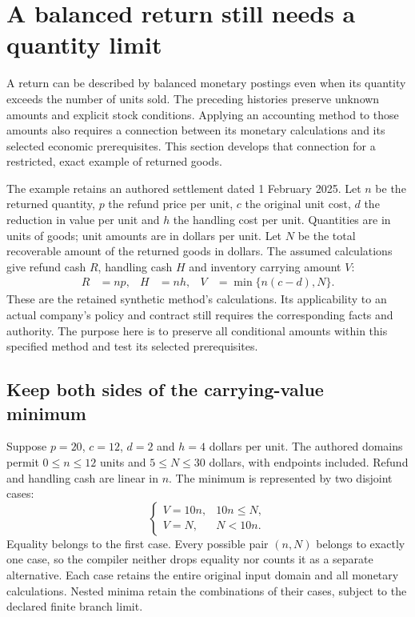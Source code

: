 \section{A balanced return still needs a quantity limit}
\label{sec:conditional-method-families}

A return can be described by balanced monetary postings even when its quantity
exceeds the number of units sold. The preceding histories preserve unknown
amounts and explicit stock conditions. Applying an accounting method to those
amounts also requires a connection between its monetary calculations and its
selected economic prerequisites. This section develops that connection for a
restricted, exact example of returned goods.

The example retains an authored settlement dated 1 February 2025. Let \(n\)
be the returned quantity, \(p\) the refund price per unit, \(c\) the original
unit cost, \(d\) the reduction in value per unit and \(h\) the handling cost
per unit. Quantities are in units of goods; unit amounts are in dollars per
unit. Let \(N\) be the total recoverable amount of the returned goods in
dollars. The assumed calculations give refund cash \(R\), handling cash \(H\)
and inventory carrying amount \(V\):
\begin{align}
\label{eq:method-family-amounts}
 R&=np, & H&=nh, & V&=\min\{n(c-d),N\}.
\end{align}
These are the retained synthetic method's calculations. Its applicability to
an actual company's policy and contract still requires the corresponding facts
and authority. The purpose here is to preserve all conditional amounts within
this specified method and test its selected prerequisites.

\subsection{Keep both sides of the carrying-value minimum}

Suppose \(p=20\), \(c=12\), \(d=2\) and \(h=4\) dollars per unit. The
authored domains permit \(0\leq n\leq12\) units and \(5\leq N\leq30\)
dollars, with endpoints included. Refund and handling cash are linear in
\(n\). The minimum is represented by two disjoint cases:
\begin{equation}
\label{eq:method-family-minimum}
 \begin{cases}
  V=10n, & 10n\leq N,\\
  V=N,   & N<10n.
 \end{cases}
\end{equation}
Equality belongs to the first case. Every possible pair \((n,N)\) belongs
to exactly one case, so the compiler neither drops equality nor counts it as a
separate alternative. Each case retains the entire original input domain and
all monetary calculations. Nested minima retain the combinations of their
cases, subject to the declared finite branch limit.

